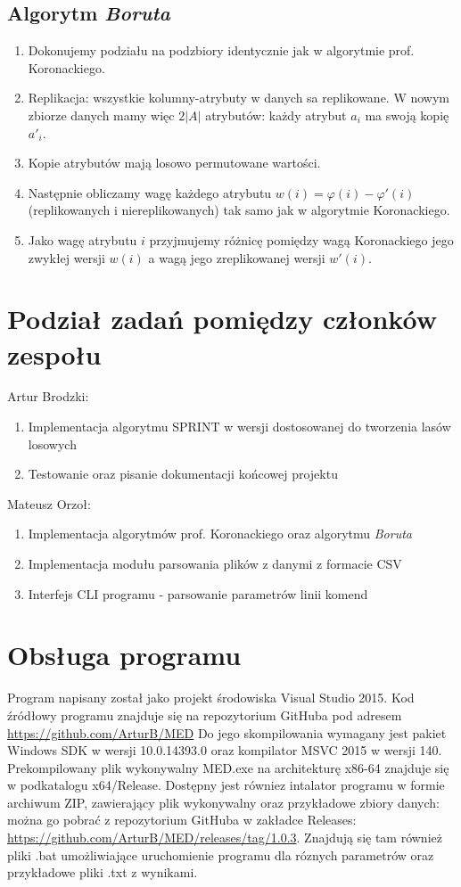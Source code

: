 \documentclass{article}
\begin{document}
\subsection{Algorytm \emph{Boruta}}
\begin{enumerate}
	\item Dokonujemy podziału na podzbiory identycznie jak w algorytmie prof. Koronackiego. 
	\item Replikacja: wszystkie kolumny-atrybuty w danych sa replikowane. W	nowym zbiorze danych mamy więc $2\left|A\right|$ atrybutów: każdy atrybut $a_i$ ma swoją kopię $a'_i$. 
	\item Kopie atrybutów mają losowo permutowane wartości. 
	\item Następnie obliczamy wagę każdego atrybutu $w(i) = \varphi(i) − \varphi'(i)$ (replikowanych i niereplikowanych) tak samo jak w algorytmie Koronackiego. 
	\item  Jako wagę atrybutu $i$ przyjmujemy różnicę pomiędzy wagą Koronackiego jego zwykłej wersji $w(i)$ a wagą jego zreplikowanej wersji $w'(i)$.
\end{enumerate}

\section{Podział zadań pomiędzy członków zespołu}

Artur Brodzki:
\begin{enumerate}
	\item Implementacja algorytmu SPRINT w wersji dostosowanej do tworzenia lasów losowych
	\item Testowanie oraz pisanie dokumentacji końcowej projektu
\end{enumerate}
Mateusz Orzoł:
\begin{enumerate}
	\item Implementacja algorytmów prof. Koronackiego oraz algorytmu \emph{Boruta}
	\item Implementacja modułu parsowania plików z danymi z formacie CSV
	\item Interfejs CLI programu - parsowanie parametrów linii komend
\end{enumerate}

\section{Obsługa programu}

Program napisany został jako projekt środowiska Visual Studio 2015. Kod źródłowy programu znajduje się na repozytorium GitHuba pod adresem \url{https://github.com/ArturB/MED} Do jego skompilowania wymagany jest pakiet Windows SDK w wersji 10.0.14393.0 oraz kompilator MSVC 2015 w wersji 140. Prekompilowany plik wykonywalny MED.exe na architekturę x86-64 znajduje się w podkatalogu x64/Release. Dostępny jest równiez intalator programu w formie archiwum ZIP, zawierający plik wykonywalny oraz przykładowe zbiory danych: można go pobrać z repozytorium GitHuba w zakładce Releases: \url{https://github.com/ArturB/MED/releases/tag/1.0.3}. Znajdują się tam również pliki .bat umożliwiające uruchomienie programu dla róznych parametrów oraz przykładowe pliki .txt z wynikami. 
\end{document}
